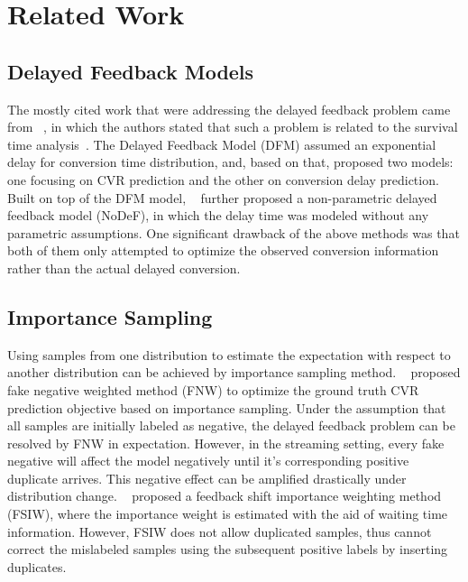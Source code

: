 \documentclass[letterpaper]{article} %
\begin{document}
\section{Related Work}

\subsection{Delayed Feedback Models}
The mostly cited work that were addressing the delayed feedback problem came from ~\citet{DFM}, in which the authors stated that such a problem is related to the survival time analysis~\cite{survival_time}. The Delayed Feedback Model (DFM) assumed an exponential delay for conversion time distribution, and, based on that, proposed two models: one focusing on CVR prediction and the other on conversion delay prediction. %
Built on top of the DFM model, ~\citet{npdfm} further proposed a non-parametric delayed feedback model (NoDeF), in which the delay time was modeled without any parametric assumptions. One significant drawback of the above methods was that both of them only attempted to optimize the observed conversion information rather than the actual delayed conversion.

\subsection{Importance Sampling}
Using samples from one distribution to estimate the expectation with respect to another distribution can be achieved by importance sampling method. ~\citet{FNW} proposed fake negative weighted method (FNW) to optimize the ground truth CVR prediction objective based on importance sampling. Under the assumption that all samples are initially labeled as negative, the delayed feedback problem can be resolved by FNW in expectation. However, in the streaming setting, every fake negative will affect the model negatively until it's corresponding positive duplicate arrives. This negative effect can be amplified drastically under distribution change. ~\citet{FSIW} proposed a feedback shift importance weighting method (FSIW), where the importance weight is estimated with the aid of waiting time information. However, FSIW does not allow duplicated samples, thus cannot correct the mislabeled samples using the subsequent positive labels by inserting duplicates.
\end{document}
